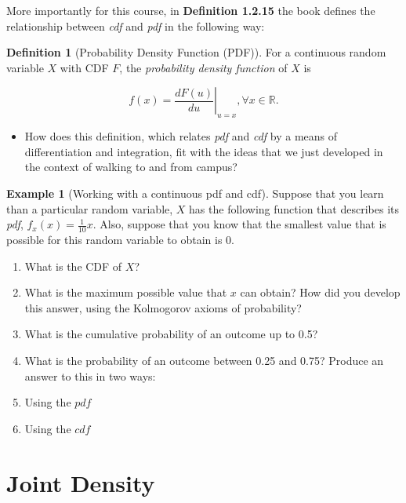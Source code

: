 \documentclass[
]{book}
\providecommand{\tightlist}{%
  \setlength{\itemsep}{0pt}\setlength{\parskip}{0pt}}
\theoremstyle{definition}
\newtheorem{definition}{Definition}[chapter]
\theoremstyle{definition}
\newtheorem{example}{Example}[chapter]
\theoremstyle{definition}
\theoremstyle{definition}
\theoremstyle{remark}
\begin{document}
More importantly for this course, in \textbf{Definition 1.2.15} the book defines the relationship between \emph{cdf} and \emph{pdf} in the following way:

\begin{definition}[Probability Density Function (PDF)]
For a continuous random variable \(X\) with CDF \(F\), the \emph{probability density function} of \(X\) is

\[
  f(x) = \left. \frac{d F(u)}{du} \right|_{u=x}, \forall x \in \mathbb{R}.
\]
\end{definition}

\begin{itemize}
\tightlist
\item
  How does this definition, which relates \emph{pdf} and \emph{cdf} by a means of differentiation and integration, fit with the ideas that we just developed in the context of walking to and from campus?
\end{itemize}

\begin{example}[Working with a continuous pdf and cdf]

Suppose that you learn than a particular random variable, \(X\) has the following function that describes its \emph{pdf}, \(f_{x}(x) = \frac{1}{10}x\). Also, suppose that you know that the smallest value that is possible for this random variable to obtain is 0.

\begin{enumerate}
\def\labelenumi{\arabic{enumi}.}
\tightlist
\item
  What is the CDF of \(X\)?
\item
  What is the maximum possible value that \(x\) can obtain? How did you develop this answer, using the Kolmogorov axioms of probability?
\item
  What is the cumulative probability of an outcome up to 0.5?
\item
  What is the probability of an outcome between 0.25 and 0.75? Produce an answer to this in two ways:
\item
  Using the \(pdf\)
\item
  Using the \(cdf\)
\end{enumerate}

\end{example}

\section{Joint Density}\label{joint-density}
\end{document}
